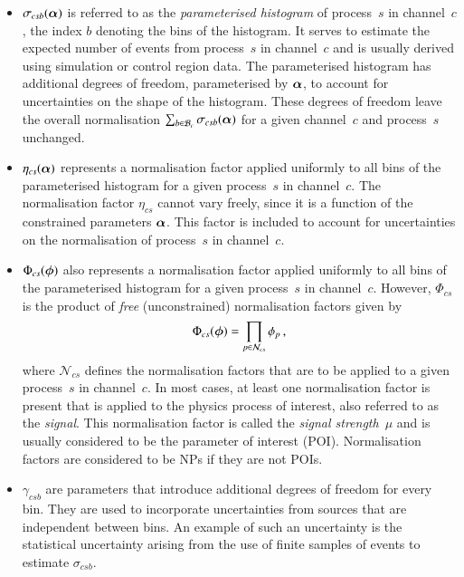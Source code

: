 \begin{itemize}

\item $\sigma_{csb}(\bm{\alpha})$ is referred to as the \emph{parameterised
    histogram} of process~$s$ in channel~$c$, the index $b$ denoting the bins of
  the histogram. It serves to estimate the expected number of events from
  process~$s$ in channel~$c$ and is usually derived using simulation or control
  region data. The parameterised histogram has additional degrees of freedom,
  parameterised by $\bm{\alpha}$, to account for uncertainties on the shape
  of the histogram. These degrees of freedom leave the overall normalisation
  $\sum_{b \in \mathcal{B}_{c}} \sigma_{csb}(\bm{\alpha})$ for a given
  channel~$c$ and process~$s$ unchanged.

\item $\eta_{cs}(\bm{\alpha})$ represents a normalisation factor applied
  uniformly to all bins of the parameterised histogram for a given process~$s$
  in channel~$c$. The normalisation factor $\eta_{cs}$ cannot vary freely, since
  it is a function of the constrained parameters $\bm{\alpha}$. This factor
  is included to account for uncertainties on the normalisation of process~$s$
  in channel~$c$.

\item $\Phi_{cs}(\bm{\phi})$ also represents a normalisation factor applied
  uniformly to all bins of the parameterised histogram for a given process~$s$
  in channel~$c$. However, $\Phi_{cs}$ is the product of \emph{free}
  (unconstrained) normalisation factors given by
  \begin{align*}
    \Phi_{cs}(\bm{\phi}) = \prod_{p \in \mathcal{N}_{cs}} \phi_p \,\text{,}
  \end{align*}
  where $\mathcal{N}_{cs}$ defines the normalisation factors that are to be
  applied to a given process~$s$ in channel~$c$.
  In most cases, at least one normalisation factor is present that is applied to
  the physics process of interest, also referred to as the \emph{signal}. This
  normalisation factor is called the \emph{signal strength}~$\mu$ and is usually
  considered to be the parameter of interest (POI). Normalisation factors are
  considered to be NPs if they are not POIs.

\item $\gamma_{csb}$ are parameters that introduce additional degrees of freedom
  for every bin. They are used to incorporate uncertainties from sources that
  are independent between bins. An example of such an uncertainty is the
  statistical uncertainty arising from the use of finite samples of events to
  estimate $\sigma_{csb}$.


\end{itemize}
